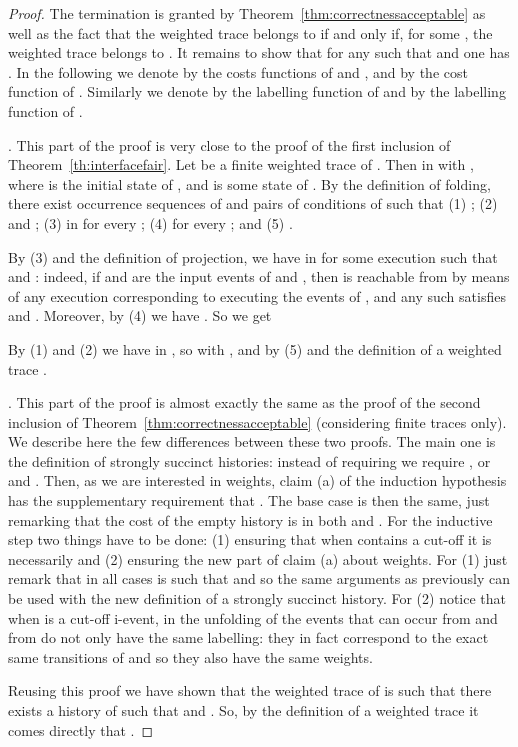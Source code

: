 \documentclass{llncs}
\begin{document}
\begin{proof}
The termination is granted by Theorem~\ref{thm:correctnessacceptable} as well as the fact that the weighted trace  belongs to  if and only if, for some , the weighted trace  belongs to .
It remains to show that for any  such that  and  one has .
In the following we denote by  the costs functions of  and , and by  the cost function of .
Similarly we denote by  the labelling function of  and by  the labelling function of .

.
This part of the proof is very close to the proof of the first inclusion of Theorem~\ref{th:interfacefair}.
Let  be a finite weighted trace of . 
Then  in  with ,
where  is the initial state of , and  is some state of .
By the definition of folding, there exist  occurrence sequences of  and  pairs of conditions of  such that
(1) ; (2)  and ; (3)  in  for every ; 
(4)  for every ;
and (5) .

By (3) and the definition of projection, we have
 in  for some execution  such that  and : indeed, if  and  are the input events of  and , then  is reachable from  by means of any execution  corresponding to executing the events of , and any
such  satisfies  and . Moreover, by (4) we have . So we get 

\noindent By (1) and (2) we have  in , so
 with , and by (5) and the definition of a weighted trace .

.
This part of the proof is almost exactly the same as the proof of the second inclusion of Theorem~\ref{thm:correctnessacceptable} (considering finite traces only).
We describe here the few differences between these two proofs.
The main one is the definition of strongly succinct histories: instead of requiring  we require , or  and .
Then, as we are interested in weights, claim (a) of the induction hypothesis has the supplementary requirement that .
The base case is then the same, just remarking that the cost of the empty history is  in both  and . 
For the inductive step two things have to be done: (1) ensuring that when  contains a cut-off it is necessarily  and (2) ensuring the new part of claim (a) about weights.
For (1) just remark that in all cases  is such that  and  so the same arguments as previously can be used with the new definition of a strongly succinct history.
For (2) notice that when  is a cut-off i-event, in the unfolding of  the events that can occur from  and from  do not only have the same labelling: they in fact correspond to the exact same transitions of  and so they also have the same weights.

Reusing this proof we have shown that the weighted trace  of  is such that there exists a history  of  such that  and .
So, by the definition of a weighted trace it comes directly that .
\end{proof}
\end{document}
